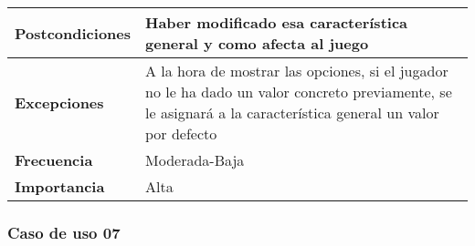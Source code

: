 \begin{longtable}{l|l}
\begin{minipage}{0.25\columnwidth}
\textbf{Postcondiciones} 
\end{minipage}
&
\begin{minipage}{0.65\columnwidth}
Haber modificado esa característica general y como afecta al juego
\end{minipage}
\\ \hline

\begin{minipage}{0.25\columnwidth}
\textbf{Excepciones} 
\end{minipage}
&
\begin{minipage}{0.65\columnwidth}
A la hora de mostrar las opciones, si el jugador no le ha dado un valor concreto previamente, se le asignará  a la característica general un valor por defecto
\end{minipage}
\\ \hline

\begin{minipage}{0.25\columnwidth}
\textbf{Frecuencia} 
\end{minipage}
&
\begin{minipage}{0.65\columnwidth}
Moderada-Baja
\end{minipage}
\\ \hline

\begin{minipage}{0.25\columnwidth}
\textbf{Importancia} 
\end{minipage}
&
\begin{minipage}{0.65\columnwidth}
Alta
\end{minipage}
\\ \hline
\end{longtable}

\subsubsection{Caso de uso 07}


